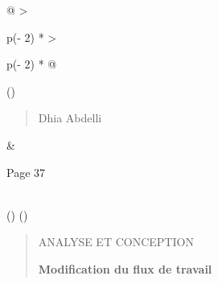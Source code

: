 \documentclass[
]{article}
\begin{document}
\begin{longtable}[]{@{}
  >{\raggedright\arraybackslash}p{(\columnwidth - 2\tabcolsep) * }
  >{\raggedright\arraybackslash}p{(\columnwidth - 2\tabcolsep) * }@{}}
\toprule()
\begin{minipage}[b]{\linewidth}\raggedright
\begin{quote}
Dhia Abdelli
\end{quote}
\end{minipage} & \begin{minipage}[b]{\linewidth}\raggedright
Page 37
\end{minipage} \\
\midrule()
\endhead
\bottomrule()
\end{longtable}

\begin{quote}
ANALYSE ET CONCEPTION

\textbf{Modification du flux de travail}
\end{quote}
\end{document}
